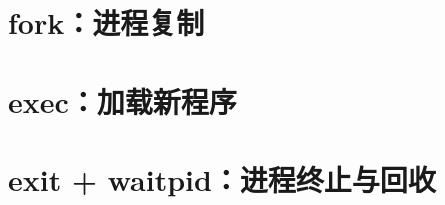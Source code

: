 \section{fork：进程复制}
\label{sec:proc-fork}

%
%
%

\section{exec：加载新程序}
\label{sec:proc-exec}

%

\section{exit + waitpid：进程终止与回收}
\label{sec:proc-exit-wait}


